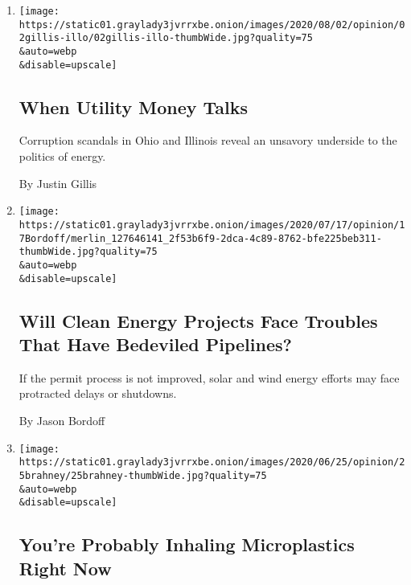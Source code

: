 \begin{enumerate}
\def\labelenumi{\arabic{enumi}.}
\item
  \href{/2020/08/02/opinion/utility-corruption-energy.html}{}

  \texttt{[image: https://static01.graylady3jvrrxbe.onion/images/2020/08/02/opinion/02gillis-illo/02gillis-illo-thumbWide.jpg?quality=75\\\&auto=webp\\\&disable=upscale]}

  \hypertarget{when-utility-money-talks}{%
  \subsection{When Utility Money Talks}\label{when-utility-money-talks}}

  Corruption scandals in Ohio and Illinois reveal an unsavory underside
  to the politics of energy.

  By Justin Gillis
\item
  \href{/2020/07/20/opinion/pipelines-clean-energy.html}{}

  \texttt{[image: https://static01.graylady3jvrrxbe.onion/images/2020/07/17/opinion/17Bordoff/merlin\_127646141\_2f53b6f9-2dca-4c89-8762-bfe225beb311-thumbWide.jpg?quality=75\\\&auto=webp\\\&disable=upscale]}

  \hypertarget{will-clean-energy-projects-face-troubles-that-have-bedeviled-pipelines}{%
  \subsection{Will Clean Energy Projects Face Troubles That Have
  Bedeviled
  Pipelines?}\label{will-clean-energy-projects-face-troubles-that-have-bedeviled-pipelines}}

  If the permit process is not improved, solar and wind energy efforts
  may face protracted delays or shutdowns.

  By Jason Bordoff
\item
  \href{/2020/06/25/opinion/plastic-air-pollution.html}{}

  \texttt{[image: https://static01.graylady3jvrrxbe.onion/images/2020/06/25/opinion/25brahney/25brahney-thumbWide.jpg?quality=75\\\&auto=webp\\\&disable=upscale]}

  \hypertarget{youre-probably-inhaling-microplastics-right-now}{%
  \subsection{You're Probably Inhaling Microplastics Right
  Now}\label{youre-probably-inhaling-microplastics-right-now}}


\end{enumerate}
